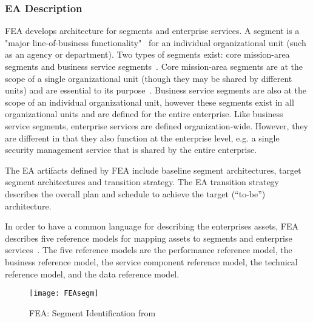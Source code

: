 \subsubsection{EA Description}
FEA develops architecture for segments and enterprise services. A segment is a "major line-of-business functionality"~\cite{sessions2007} for an individual organizational unit (such as an agency or department). Two types of segments exist: core mission-area segments and business service segments~\cite{FEA_PMO2007}. Core mission-area segments are at the scope of a single organizational unit (though they may be shared by different units) and are essential to its purpose~\cite{sessions2007,FEA_PMO2007}. Business service segments are also at the scope of an individual organizational unit, however these segments exist in all organizational units and are defined for the entire enterprise. Like business service segments, enterprise services are defined organization-wide. However, they are different in that they also function at the enterprise level, e.g. a single security management service that is shared by the entire enterprise. 

The EA artifacts defined by FEA include  baseline segment architectures, target segment architectures and transition strategy. The EA transition strategy describes the overall plan and schedule to achieve the target (“to-be”) architecture.

%
%

In order to have a common language for describing the enterprises assets, FEA describes five reference models for mapping assets to segments and enterprise services~\cite{FEA_PMO2007}. The five reference models are the performance reference model, the business reference model, the service component reference model, the technical reference model, and the data reference model. 
\begin{figure}
\centering
\texttt{[image: FEAsegm]}
\caption{FEA: Segment Identification from ~\cite{FEA_PMO2007}}
\label{fig:FEA_segmentID}
\end{figure}

